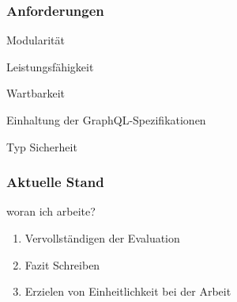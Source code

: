\begin{frame}
    \frametitle{Anforderungen}

    \begin{alertblock}{Modularität}
    \end{alertblock}
    \begin{alertblock}{Leistungsfähigkeit}
    \end{alertblock}
    \begin{alertblock}{Wartbarkeit}
    \end{alertblock}
    \begin{alertblock}{Einhaltung der GraphQL-Spezifikationen}
    \end{alertblock}
    \begin{alertblock}{Typ Sicherheit}
    \end{alertblock}

\end{frame}








\begin{frame}{}
    \frametitle{Aktuelle Stand}

    \footnotesize

    \begin{alertblock}{woran ich arbeite?}
        \begin{enumerate}
            \item Vervollständigen der Evaluation
            \item Fazit Schreiben
            \item Erzielen von Einheitlichkeit bei der Arbeit
        \end{enumerate}
    \end{alertblock}

\end{frame}